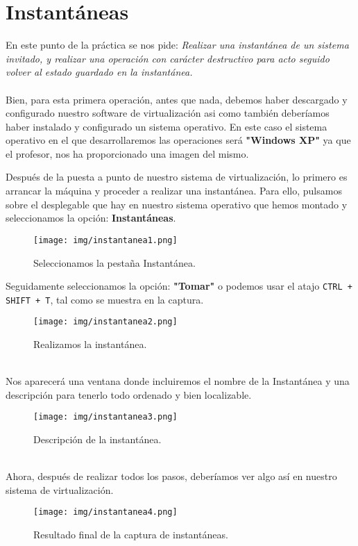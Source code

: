 \documentclass[12pt]{article}
\begin{document}
    \section{Instantáneas}
      En este punto de la práctica se nos pide: \textit{Realizar una instantánea de un sistema invitado, y realizar una operación con carácter 
      destructivo para acto seguido volver al estado guardado en la instantánea.}
      \\\\
      Bien, para esta primera operación, antes que nada, debemos haber descargado y configurado nuestro software de virtualización asi como 
      también deberíamos haber instalado y configurado un sistema operativo. En este caso el sistema operativo en el que desarrollaremos las 
      operaciones será \textbf{"Windows XP"} ya que el profesor, nos ha proporcionado una imagen del mismo.

      Después de la puesta a punto de nuestro sistema de virtualización, lo primero es arrancar la máquina y proceder a realizar una instantánea.
      Para ello, pulsamos sobre el desplegable que hay en nuestro sistema operativo que hemos montado y seleccionamos la opción: \textbf{Instantáneas}.
      \begin{figure}[h]
        \centering
        \texttt{[image: img/instantanea1.png]}
        \caption{Seleccionamos la pestaña Instantánea.}
        \label{Instantanea1}
      \end{figure}

      \newpage

      Seguidamente seleccionamos la opción: \textbf{"Tomar"} o podemos usar el atajo \texttt{CTRL + SHIFT + T}, tal como se muestra en la captura.
      \begin{figure}[h]
        \centering
        \texttt{[image: img/instantanea2.png]}
        \caption{Realizamos la instantánea.}
        \label{Instantanea2}
      \end{figure}
      \\
      Nos aparecerá una ventana donde incluiremos el nombre de la Instantánea y una descripción para tenerlo todo ordenado y bien localizable.
      \begin{figure}[h]
        \centering
        \texttt{[image: img/instantanea3.png]}
        \caption{Descripción de la instantánea.}
      \end{figure}
      \label{Instantanea3}
      \\
      Ahora, después de realizar todos los pasos, deberíamos ver algo así en nuestro sistema de virtualización.
      \begin{figure}[h]
        \centering
        \texttt{[image: img/instantanea4.png]}
        \caption{Resultado final de la captura de instantáneas.}
        \label{Instantanea4}
      \end{figure}
\end{document}
